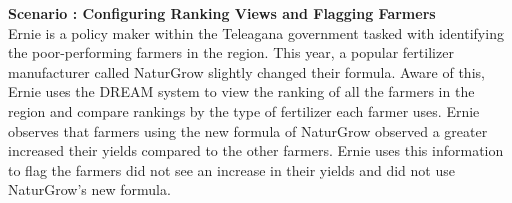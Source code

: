 \begin{flushleft}
\textbf{Scenario : Configuring Ranking Views and Flagging Farmers}\\\smallskip
Ernie is a policy maker within the Teleagana government tasked with identifying the poor-performing farmers in the region. This year, a popular fertilizer manufacturer called NaturGrow slightly changed their formula. Aware of this, Ernie uses the DREAM system to view the ranking of all the farmers in the region and compare rankings by the type of fertilizer each farmer uses. Ernie observes that farmers using the new formula of NaturGrow observed a greater increased their yields compared to the other farmers. Ernie uses this information to flag the farmers did not see an increase in their yields and did not use NaturGrow's new formula. 
\end{flushleft}
